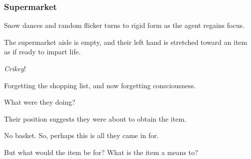 \documentclass[noamssymb,
graphics,
]{beamer} %
\begin{document}



\begin{frame}
  \frametitle{Supermarket}

  {\rmfamily

    Snow dances and random flicker turns to rigid form as the agent regains focus.

    The supermarket aisle is empty, and their left hand is stretched toward an item as if ready to impart life.

    \emph{Crikey}!

    Forgetting the shopping list, and now forgetting consciousness.

    What were they doing?

    Their position suggests they were about to obtain the item.

    No basket. So, perhaps this is all they came in for.

    But what would the item be for?  What is the item a means to?

  }
\end{frame}
\end{document}
